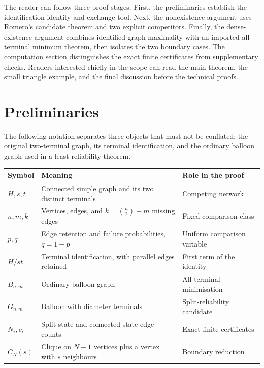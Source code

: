 \documentclass[
  11pt,
]{article}
\newcounter{none} %
\theoremstyle{definition}
\theoremstyle{remark}
\begin{document}
The reader can follow three proof stages. First, the preliminaries
establish the identification identity and exchange tool. Next, the
nonexistence argument uses Romero's candidate theorem and two explicit
competitors. Finally, the dense-existence argument combines
identified-graph maximality with an imported all-terminal minimum
theorem, then isolates the two boundary cases. The computation section
distinguishes the exact finite certificates from supplementary checks.
Readers interested chiefly in the scope can read the main theorem, the
small triangle example, and the final discussion before the technical
proofs.

\section{Preliminaries}\label{preliminaries}

The following notation separates three objects that must not be
conflated: the original two-terminal graph, its terminal identification,
and the ordinary balloon graph used in a least-reliability theorem.

{\def\LTcaptype{none} %
\begin{longtable}[]{@{}
  >{\raggedright\arraybackslash}p{}
  >{\raggedright\arraybackslash}p{}
  >{\raggedright\arraybackslash}p{}@{}}
\toprule\noalign{}
\begin{minipage}[b]{\linewidth}\raggedright
Symbol
\end{minipage} & \begin{minipage}[b]{\linewidth}\raggedright
Meaning
\end{minipage} & \begin{minipage}[b]{\linewidth}\raggedright
Role in the proof
\end{minipage} \\
\midrule\noalign{}
\endhead
\bottomrule\noalign{}
\endlastfoot
\(H,s,t\) & Connected simple graph and its two distinct terminals &
Competing network \\
\(n,m,k\) & Vertices, edges, and \(k=\binom n2-m\) missing edges & Fixed
comparison class \\
\(p,q\) & Edge retention and failure probabilities, \(q=1-p\) & Uniform
comparison variable \\
\(H/st\) & Terminal identification, with parallel edges retained & First
term of the identity \\
\(B_{n,m}\) & Ordinary balloon graph & All-terminal minimisation \\
\(G_{n,m}\) & Balloon with diameter terminals & Split-reliability
candidate \\
\(N_i,c_i\) & Split-state and connected-state edge counts & Exact finite
certificates \\
\(C_N(s)\) & Clique on \(N-1\) vertices plus a vertex with \(s\)
neighbours & Boundary reduction \\
\end{longtable}
}
\end{document}

